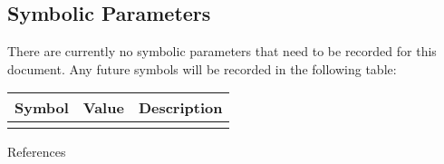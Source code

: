 \documentclass[12pt]{article}
\begin{document}
\subsection{Symbolic Parameters}

There are currently no symbolic parameters that need to be recorded for this document. Any future symbols will be recorded in the following table: 

\begin{table}[h]
\begin{tabular}{|c|c|l|}
\hline
\textbf{Symbol} & \textbf{Value} & \textbf{Description} \\ \hline
                &                &                      \\ \hline
\end{tabular}
\end{table}

\newpage



 {References}
\end{document}
